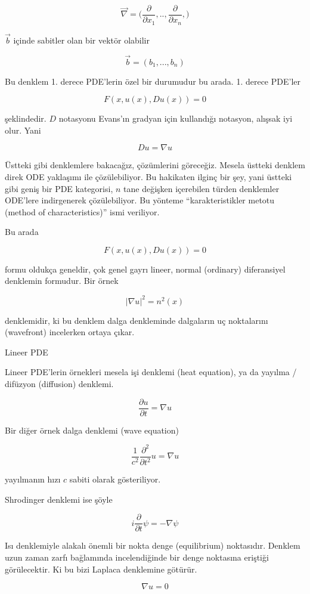 \documentclass[12pt,fleqn]{article}\usepackage{../../common}
\begin{document}
$$ \vec{\nabla} = \bigg( 
\frac{\partial }{\partial x_1},.., 
\frac{\partial }{\partial x_n},
\bigg)
$$

$\vec{b}$ içinde sabitler olan bir vektör olabilir

$$ \vec{b} = (b_1,...,b_n)
 $$

Bu denklem 1. derece PDE'lerin özel bir durumudur bu arada. 1. derece
PDE'ler 

$$ F(x, u(x), Du(x)) = 0 $$

şeklindedir. $D$ notasyonu Evans'ın gradyan için kullandığı notasyon,
alışsak iyi olur. Yani

$$ Du = \nabla u $$

Üstteki gibi denklemlere bakacağız, çözümlerini göreceğiz. Mesela üstteki
denklem direk ODE yaklaşımı ile çözülebiliyor. Bu hakikaten ilginç bir şey,
yani üstteki gibi geniş bir PDE kategorisi, $n$ tane değişken içerebilen
türden denklemler ODE'lere indirgenerek çözülebiliyor. Bu yönteme
``karakteristikler metotu (method of characteristics)'' ismi veriliyor.

Bu arada

$$ F(x, u(x), Du(x)) = 0 $$

formu oldukça geneldir, çok genel gayrı lineer, normal (ordinary)
diferansiyel denklemin formudur. Bir örnek

$$ |\nabla u|^2 = n^2(x) $$

denklemidir, ki bu denklem dalga denkleminde dalgaların uç noktalarını
(wavefront) incelerken ortaya çıkar. 

Lineer PDE

Lineer PDE'lerin örnekleri mesela işi denklemi (heat equation), ya da
yayılma / difüzyon (diffusion) denklemi.

$$ \frac{\partial u}{\partial t} = 
\nabla  u
$$

Bir diğer örnek dalga denklemi (wave equation)

$$ \frac{1}{c^2} \frac{\partial ^2}{\partial t^2}u = \nabla u$$

yayılmanın hızı $c$ sabiti olarak gösteriliyor. 

Shrodinger denklemi ise şöyle

$$ i \frac{\partial }{\partial t}\psi  = -\nabla \psi $$

Isı denklemiyle alakalı önemli bir nokta denge (equilibrium)
noktasıdır. Denklem uzun zaman zarfı bağlamında incelendiğinde bir denge
noktasına eriştiği görülecektir. Ki bu bizi Laplaca denklemine götürür. 

$$ \nabla u = 0 $$
\end{document}
